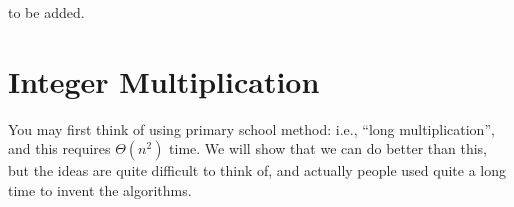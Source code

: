 \documentclass[11pt, a4paper]{COMP3711}
\begin{document}
\begin{spacing}{1.5}
    {\Large\color{red} to be added.}

    \section{Integer Multiplication}

    You may first think of using primary school method: 
    i.e., ``long multiplication'', and this requires $\Theta(n^2)$
    time. We will show that we can do better than this, but 
    the ideas are quite difficult to think of, and actually 
    people used quite a long time to invent the algorithms.


\end{spacing}
\end{document}
